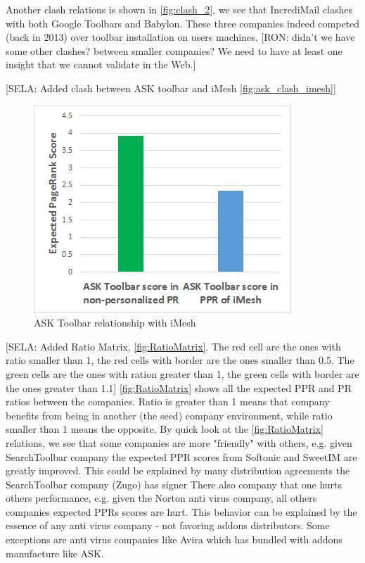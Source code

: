 \documentclass[11pt,oneside]{book}
\begin{document}
Another clash relations is shown in \autoref{fig:clash_2}, we see that IncrediMail clashes with both Google Toolbars and Babylon. These three companies indeed competed (back in 2013) over toolbar installation on users machines. [RON: didn't we have some other clashes? between smaller companies? We need to have at least one insight that we cannot validate in the Web.]

[SELA: Added clash between ASK toolbar and iMesh \autoref{fig:ask_clash_imesh}]

\begin{figure}[h]
\centering
\includegraphics[width=\linewidth]{figures/ask_clash_imesh.png}
\caption{ASK Toolbar relationship with iMesh}
\label{fig:ask_clash_imesh}
\end{figure}

[SELA: Added Ratio Matrix, \autoref{fig:RatioMatrix}. The red cell are the ones with ratio smaller than 1, the red cells with border are the ones smaller than 0.5. The green cells are the ones with ration greater than 1, the green cells with border are the ones greater than 1.1]
\autoref{fig:RatioMatrix} shows all the expected PPR and PR ratios between the companies. Ratio is greater than 1 means that company benefits from being in another (the seed) company environment, while ratio smaller than 1 means the opposite. By quick look at the \autoref{fig:RatioMatrix} relations, we see that some companies are more "friendly" with others, e.g. given SearchToolbar company the expected PPR scores from Softonic and SweetIM are greatly improved. This could be explained by many distribution agreements the SearchToolbar company (Zugo) has signer  There also company that one hurts others performance, e.g. given the Norton anti virus company, all others companies expected PPRs scores are hurt. This behavior can be explained by the essence of any anti virus company - not favoring addons distributors. Some exceptions are anti virus companies like Avira which has bundled with addons manufacture like ASK.
\end{document}
